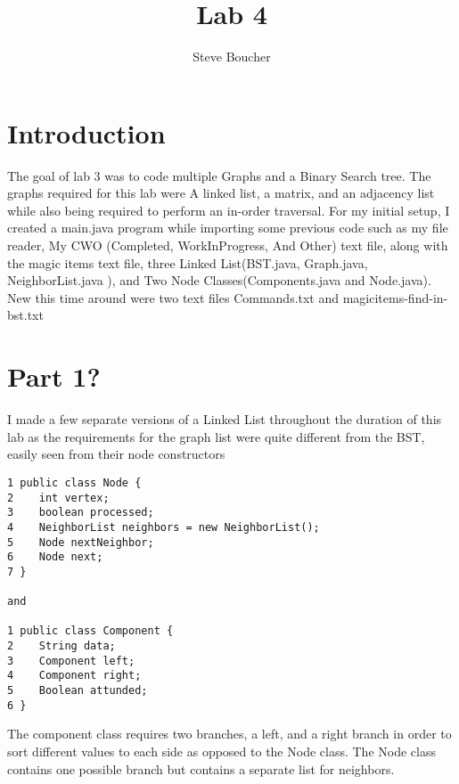 \documentclass{article}
\title{Lab 4}
\author{Steve Boucher}
\begin{document}



\section{Introduction}
The goal of lab 3 was to code multiple Graphs and a Binary Search tree. The graphs required for this lab were A linked list, a matrix, and an adjacency list while also being required to perform an in-order traversal. For my initial setup, I created a main.java program while importing some previous code such as my file reader, My CWO (Completed, WorkInProgress, And Other) text file, along with the magic items text file, three Linked List(BST.java, Graph.java, NeighborList.java ), and Two Node Classes(Components.java and Node.java). New this time around were two text files Commands.txt and magicitems-find-in-bst.txt

\section{Part 1?}
I made a few separate versions of a Linked List throughout the duration of this lab as the requirements for the graph list were quite different from the BST, easily seen from their node constructors
\begin{verbatim}
1 public class Node {
2    int vertex;
3    boolean processed;
4    NeighborList neighbors = new NeighborList();
5    Node nextNeighbor;
6    Node next;
7 }

and 

1 public class Component {
2    String data;
3    Component left;
4    Component right;
5    Boolean attunded;
6 }

\end{verbatim}
The component class requires two branches, a left, and a right branch in order to sort different values to each side as opposed to the Node class. The Node class contains one possible branch but contains a separate list for neighbors. 
\end{document}
